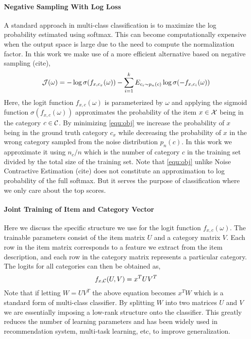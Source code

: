 \paragraph{Negative Sampling With Log Loss}
A standard approach in multi-class classification is to maximize the log probability estimated using softmax. This can become computationally expensive when the output space is large due to the need to compute the normalization factor. In this work we make use of a more efficient alternative based on negative sampling (cite),
\begin{align}
\label{equ:obj}
    \mathcal{J}(\omega) = 
    - \log \sigma(f_{x, c_x}(\omega)) 
    - \sum_{i=1}^k E_{c_i \sim p_n(c)} \log \sigma(-f_{x, c_i}(\omega))
\end{align}
Here, the logit function $f_{x, c}(\omega)$ is parameterized by $\omega$ and applying the sigmoid function $\sigma(f_{x, c}(\omega))$ approximates the probability of the item $x \in \mathcal{X}$ being in the category $c \in \mathcal{C}$. 
By minimizing \eqref{equ:obj} we increase the probability of $x$ being in the ground truth category $c_x$ while decreasing the probability of $x$ in the wrong category sampled from the noise distribution $p_n(c)$. In this work we approximate it using $n_c / n$ which is the number of category $c$ in the training set divided by the total size of the training set. Note that \eqref{equ:obj} unlike Noise Contractive Estimation (cite) does not constitute an approximation to log probability of the full softmax. 
But it serves the purpose of classification where we only care about the top scores.

\paragraph{Joint Training of Item and Category Vector}
Here we discuss the specific structure we use for the logit function $f_{x, c}(\omega)$. The trainable parameters consist of the item matrix $U$ and a category matrix $V$. Each row in the item matrix corresponds to a feature we extract from the item description, and each row in the category matrix represents a particular category. The logits for all categories can then be obtained as,
\begin{align*}
    f_{x, \mathcal{C}}(U, V) = x^TUV^T
\end{align*}
Note that if letting $W = UV^T$ the above equation becomes $x^TW$ which is a standard form of multi-class classifier. By splitting $W$ into two matrices $U$ and $V$ we are essentially imposing a low-rank structure onto the classifier. This greatly reduces the number of learning parameters and has been widely used in recommendation system, multi-task learning, etc, to improve generalization.


